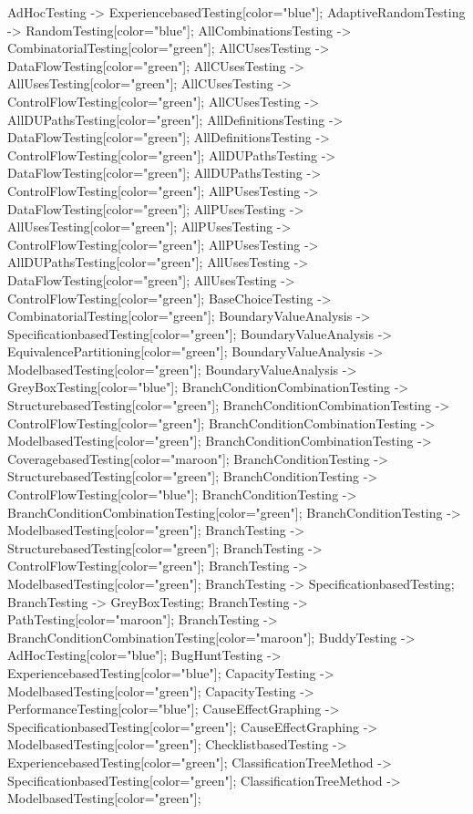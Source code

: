 \documentclass{article}
\begin{document}
{AdHocTesting -> ExperiencebasedTesting[color="blue"];
AdaptiveRandomTesting -> RandomTesting[color="blue"];
AllCombinationsTesting -> CombinatorialTesting[color="green"];
AllCUsesTesting -> DataFlowTesting[color="green"];
AllCUsesTesting -> AllUsesTesting[color="green"];
AllCUsesTesting -> ControlFlowTesting[color="green"];
AllCUsesTesting -> AllDUPathsTesting[color="green"];
AllDefinitionsTesting -> DataFlowTesting[color="green"];
AllDefinitionsTesting -> ControlFlowTesting[color="green"];
AllDUPathsTesting -> DataFlowTesting[color="green"];
AllDUPathsTesting -> ControlFlowTesting[color="green"];
AllPUsesTesting -> DataFlowTesting[color="green"];
AllPUsesTesting -> AllUsesTesting[color="green"];
AllPUsesTesting -> ControlFlowTesting[color="green"];
AllPUsesTesting -> AllDUPathsTesting[color="green"];
AllUsesTesting -> DataFlowTesting[color="green"];
AllUsesTesting -> ControlFlowTesting[color="green"];
BaseChoiceTesting -> CombinatorialTesting[color="green"];
BoundaryValueAnalysis -> SpecificationbasedTesting[color="green"];
BoundaryValueAnalysis -> EquivalencePartitioning[color="green"];
BoundaryValueAnalysis -> ModelbasedTesting[color="green"];
BoundaryValueAnalysis -> GreyBoxTesting[color="blue"];
BranchConditionCombinationTesting -> StructurebasedTesting[color="green"];
BranchConditionCombinationTesting -> ControlFlowTesting[color="green"];
BranchConditionCombinationTesting -> ModelbasedTesting[color="green"];
BranchConditionCombinationTesting -> CoveragebasedTesting[color="maroon"];
BranchConditionTesting -> StructurebasedTesting[color="green"];
BranchConditionTesting -> ControlFlowTesting[color="blue"];
BranchConditionTesting -> BranchConditionCombinationTesting[color="green"];
BranchConditionTesting -> ModelbasedTesting[color="green"];
BranchTesting -> StructurebasedTesting[color="green"];
BranchTesting -> ControlFlowTesting[color="green"];
BranchTesting -> ModelbasedTesting[color="green"];
BranchTesting -> SpecificationbasedTesting;
BranchTesting -> GreyBoxTesting;
BranchTesting -> PathTesting[color="maroon"];
BranchTesting -> BranchConditionCombinationTesting[color="maroon"];
BuddyTesting -> AdHocTesting[color="blue"];
BugHuntTesting -> ExperiencebasedTesting[color="blue"];
CapacityTesting -> ModelbasedTesting[color="green"];
CapacityTesting -> PerformanceTesting[color="blue"];
CauseEffectGraphing -> SpecificationbasedTesting[color="green"];
CauseEffectGraphing -> ModelbasedTesting[color="green"];
ChecklistbasedTesting -> ExperiencebasedTesting[color="green"];
ClassificationTreeMethod -> SpecificationbasedTesting[color="green"];
ClassificationTreeMethod -> ModelbasedTesting[color="green"];
}
\end{document}
